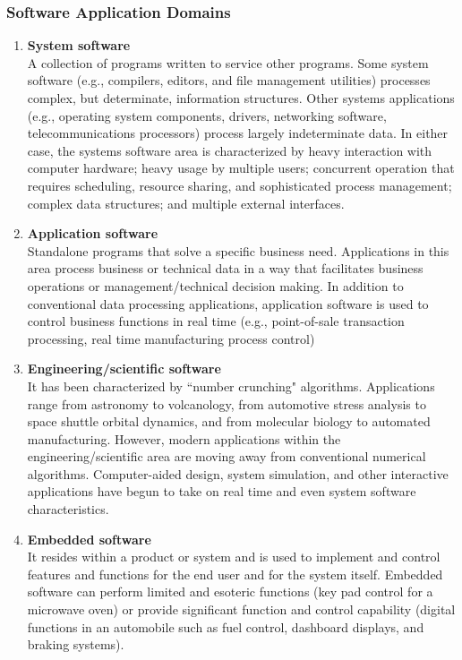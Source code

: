 \documentclass{article}
\begin{document}
	\subsubsection{Software Application Domains}
	\begin{enumerate}[label=\arabic*)]
		\item \textbf{System software} \\
			A collection of programs written to service other programs.
			Some system software (e.g., compilers, editors, and file management utilities) processes complex,
				but determinate, information structures.
			Other systems applications (e.g., operating system components, drivers, networking software,
				telecommunications processors) process largely indeterminate data.
			In either case, the systems software area is characterized by heavy interaction with computer
				hardware; heavy usage by multiple users; concurrent operation that requires scheduling, resource
				sharing, and sophisticated process management; complex data structures; and multiple external
				interfaces.

		\item \textbf{Application software} \\
			Standalone programs that solve a specific business need.
			Applications in this area process business or technical data in a way that facilitates business
				operations or management/technical decision making.
			In addition to conventional data processing applications, application software is used to control
				business functions in real time (e.g., point-of-sale transaction processing, real time
				manufacturing process control)

		\item \textbf{Engineering/scientific software} \\
			It has been characterized by ``number crunching" algorithms.
			Applications range from astronomy to volcanology, from automotive stress analysis to space shuttle
				orbital dynamics, and from molecular biology to automated manufacturing.
			However, modern applications within the engineering/scientific area are moving away from
				conventional numerical algorithms.
			Computer-aided design, system simulation, and other interactive applications have begun to take on
				real time and even system software characteristics.

		\item \textbf{Embedded software} \\
			It resides within a product or system and is used to implement and control features and functions
				for the end user and for the system itself.
			Embedded software can perform limited and esoteric functions (key pad control for a microwave oven)
				or provide significant function and control capability (digital functions in an automobile such
				as fuel control, dashboard displays, and braking systems).


\end{enumerate}
\end{document}

